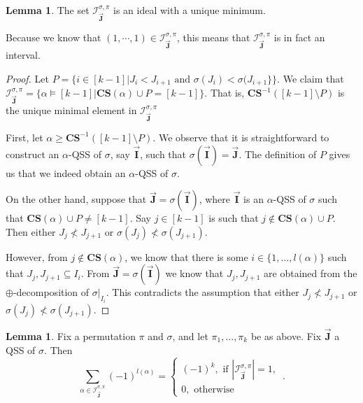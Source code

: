 \documentclass[12pt, reqno]{amsart}
\theoremstyle{definition}
\newtheorem{lm}[thm]{Lemma}
\newcommand{\III}{\vec{\mathbf{I}}}
\newcommand{\JJJ}{\vec{\mathbf{J}}}
\begin{document}
\begin{lm}\label{lm:principalideal}
The set $\mathcal I^{\sigma, \pi }_{\JJJ} $ is an ideal with a unique minimum.
\end{lm}

Because we know that $(1, \cdots , 1) \in \mathcal I^{\sigma, \pi }_{\JJJ} $, this means that $\mathcal I^{\sigma, \pi }_{\JJJ} $  is in fact an interval.

\begin{proof}
Let $P=\{i \in [k-1]| J_i < J_{i+1} \text{ and } \sigma(J_i) < \sigma( J_{i+1}\}\}$.
We claim that $\mathcal I^{\sigma, \pi }_{\JJJ} = \{ \alpha \models [k-1] | \mathbf{CS}(\alpha ) \cup P = [k-1] \}$.
That is, $\mathbf{CS}^{-1}([k-1]\setminus P ) $ is the unique minimal element in $\mathcal I^{\sigma, \pi }_{\JJJ} $

First, let $\alpha \geq \mathbf{CS}^{-1}([k-1]\setminus P ) $.
We observe that it is straightforward to construct an $\alpha$-QSS of $\sigma$, say $\III $, such that $\sigma(\III) = \JJJ$.
The definition of $P$ gives us that we indeed obtain an $\alpha$-QSS of $\sigma$.

On the other hand, suppose that $\JJJ = \sigma (\III )$, where $\III$ is an $\alpha$-QSS of $\sigma$ such that $\mathbf{CS}(\alpha ) \cup P \neq [k-1] $.
Say $j\in [k-1] $ is such that $j \not \in\mathbf{CS}(\alpha ) \cup P$.
Then either $J_j \not< J_{j+1}$ or $\sigma(J_j) \not< \sigma (J_{j+1})$.

However, from $j\not\in \mathbf{CS}(\alpha )$, we know that there is some $i\in \{1, \dots , l(\alpha ) \}$ such that $J_j, J_{j+1}\subseteq I_i$.
From $\JJJ = \sigma (\III )$ we know that $J_j, J_{j+1}$ are obtained from the $\oplus$-decomposition of $\sigma|_{I_i}$.
This contradicts the assumption that either $J_j \not< J_{j+1}$ or $\sigma(J_j) \not< \sigma (J_{j+1})$.
\end{proof}

\begin{lm}\label{lm:posetsumcancelation}
Fix a permutation $\pi$ and $\sigma $, and let $\pi_1, \dots ,\pi_k$ be as above.
Fix $\JJJ$ a QSS of $\sigma $.
Then
$$\sum_{\alpha \in \mathcal I^{\sigma, \pi }_{\JJJ}}(-1)^{ l(\alpha )} = \begin{cases}
(-1)^k, \text{ if } |\mathcal I^{\sigma, \pi }_{\JJJ} | = 1, \\
0, \text{ otherwise }
\end{cases} \, . $$
\end{lm}
\end{document}
